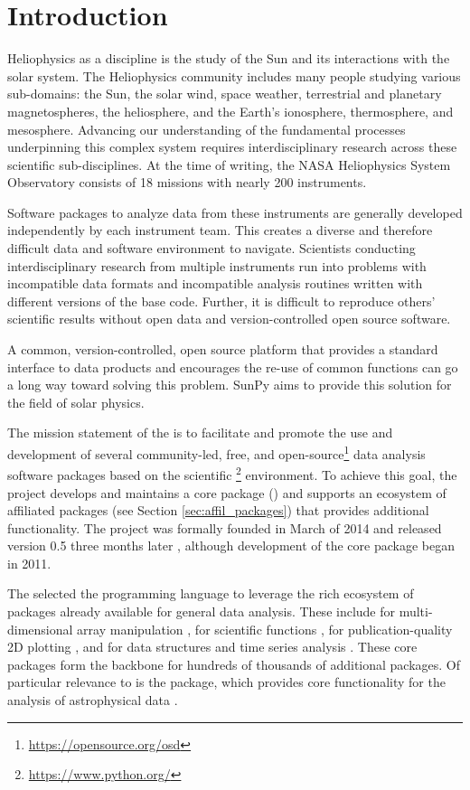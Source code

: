 \section{Introduction}
\label{sec:intro}

Heliophysics as a discipline is the study of the Sun and its interactions with the solar system. 
The Heliophysics community includes many people studying various sub-domains: the Sun, the solar wind, space weather, terrestrial and planetary magnetospheres, the heliosphere, and the Earth's ionosphere, thermosphere, and mesosphere.  
Advancing our understanding of the fundamental processes underpinning this complex system requires interdisciplinary research across these scientific sub-disciplines.
At the time of writing, the NASA Heliophysics System Observatory consists of 18 missions with nearly 200 instruments.

Software packages to analyze data from these instruments are generally developed independently by each instrument team. 
This creates a diverse and therefore difficult data and software environment to navigate. 
Scientists conducting interdisciplinary research from multiple instruments run into problems with incompatible data formats and incompatible analysis routines written with different versions of the base code. Further, it is difficult to reproduce others' scientific results without open data and version-controlled open source software.

A common, version-controlled, open source platform that provides a standard interface to data products and encourages the re-use of common functions can go a long way toward solving this problem. 
SunPy aims to provide this solution for the field of solar physics.

The mission statement of the \sunpyproj is to facilitate and promote the use and development of several community-led, free, and open-source\footnote{\url{https://opensource.org/osd}} data analysis software packages based on the scientific \python\footnote{\url{https://www.python.org/}} environment.
To achieve this goal, the project develops and maintains a core package (\sunpypkg) and supports an ecosystem of affiliated packages (see Section \ref{sec:affil_packages}) that provides additional functionality. 
The project was formally founded in March of 2014 and released version 0.5 three months later \citep{Community:2015cy}, although development of the core package began in 2011. 

The \sunpyproj selected the \python programming language to leverage the rich ecosystem of packages already available for general data analysis. 
These include  for multi-dimensional array manipulation \citep{numpy},  for scientific functions \citep{scipy},  for publication-quality 2D plotting \citep{matplotlib}, and  for data structures and time series analysis \citep{pandas}.
These core packages form the backbone for hundreds of thousands of additional \python packages.
Of particular relevance to \sunpypkg is the \astropypkg package, which provides core functionality for the analysis of astrophysical data \citep{astropy2018}. 

